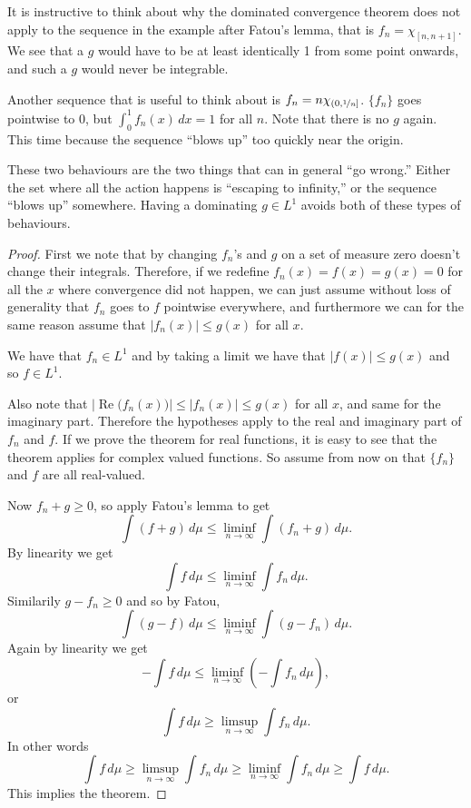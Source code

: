 \documentclass[12pt]{book}
\renewcommand{\Re}{\operatorname{Re}}
\newcommand{\abs}[1]{\left\lvert {#1} \right\rvert}
\theoremstyle{plain}
\theoremstyle{remark}
\theoremstyle{definition}
\theoremstyle{exercise}
\theoremstyle{example}
\begin{document}
\medskip

It is instructive to think about why the dominated convergence theorem does
not apply to the sequence in the example after Fatou's lemma, that is
$f_n = \chi_{[n,n+1]}$.  We see that a $g$ would have to be at least
identically 1 from some point onwards, and such a $g$ would never be
integrable.

Another sequence that is useful to think about is
$f_n = n\chi_{(0,\nicefrac{1}{n}]}$.  $\{ f_n \}$ goes pointwise to 0, but
$\int_0^1 f_n(x) \,dx = 1$ for all $n$.  Note that there is no $g$ again.
This time because the sequence ``blows up'' too quickly near the origin.

These two behaviours are the two things that can in general ``go wrong.''
Either the set where all the action happens is ``escaping to infinity,'' 
or the sequence ``blows up'' somewhere.  Having a dominating
$g \in L^1$ avoids both of these types of behaviours.

\medskip

\begin{proof}
First we note that by changing $f_n$'s and $g$ on a set of measure zero
doesn't change their integrals.  Therefore, if we redefine $f_n(x) = f(x) = g(x) =
0$ for all the $x$ where convergence did not happen, we can just assume
without loss of generality that $f_n$ goes to $f$ pointwise everywhere, and
furthermore we can for the same reason assume that $\abs{f_n(x)} \leq g(x)$
for all $x$.

We have that $f_n \in L^1$ and by taking a limit we have
that $\abs{f(x)} \leq g(x)$ and so $f \in L^1$.

Also note that $\abs{\Re\bigl(f_n(x)\bigr)} \leq \abs{f_n(x)} \leq g(x)$
for all $x$,
and same for the imaginary part.  Therefore the hypotheses apply to
the real and imaginary part of $f_n$ and $f$.  If we prove the theorem for
real functions, it is easy to see that the theorem applies for complex valued
functions.
So assume from now on that $\{ f_n \}$ and $f$ are all real-valued.

Now $f_n + g \geq 0$, so apply Fatou's lemma to get
$$
\int (f+g) \,d\mu \leq \liminf_{n\to\infty} \int (f_n+g)\, d\mu .
$$
By linearity we get
$$
\int f \,d\mu \leq \liminf_{n\to\infty} \int f_n \, d\mu .
$$
Similarily $g-f_n \geq 0$ and so by Fatou,
$$
\int (g-f) \,d\mu \leq \liminf_{n\to\infty} \int (g-f_n)\, d\mu .
$$
Again by linearity we get
$$
- \int f \,d\mu \leq \liminf_{n\to\infty} \left( - \int f_n \, d\mu \right) ,
$$
or
$$
\int f \,d\mu \geq \limsup_{n\to\infty} \int f_n \, d\mu .
$$
In other words
$$
\int f \,d\mu \geq \limsup_{n\to\infty} \int f_n \, d\mu \geq
\liminf_{n\to\infty} \int f_n \, d\mu \geq \int f\, d\mu .
$$
This implies the theorem.
\end{proof}
\end{document}
